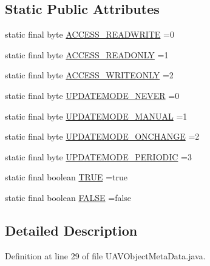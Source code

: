 \subsection*{Static Public Attributes}
\begin{DoxyCompactItemize}
\item 
static final byte \hyperlink{classorg_1_1taulabs_1_1uavtalk_1_1_u_a_v_object_meta_data_a44a12338675af0ecb539a87a976cac48}{A\-C\-C\-E\-S\-S\-\_\-\-R\-E\-A\-D\-W\-R\-I\-T\-E} =0
\item 
static final byte \hyperlink{classorg_1_1taulabs_1_1uavtalk_1_1_u_a_v_object_meta_data_a3c2ab96994694c0e1fd3578b84644d18}{A\-C\-C\-E\-S\-S\-\_\-\-R\-E\-A\-D\-O\-N\-L\-Y} =1
\item 
static final byte \hyperlink{classorg_1_1taulabs_1_1uavtalk_1_1_u_a_v_object_meta_data_a5f5fd42d243c55d5b5d1c657389cb56d}{A\-C\-C\-E\-S\-S\-\_\-\-W\-R\-I\-T\-E\-O\-N\-L\-Y} =2
\item 
static final byte \hyperlink{classorg_1_1taulabs_1_1uavtalk_1_1_u_a_v_object_meta_data_a361f627b8e98cf0b4521954857e8b001}{U\-P\-D\-A\-T\-E\-M\-O\-D\-E\-\_\-\-N\-E\-V\-E\-R} =0
\item 
static final byte \hyperlink{classorg_1_1taulabs_1_1uavtalk_1_1_u_a_v_object_meta_data_aab602b38cbe3e4aebba939b0c865e45a}{U\-P\-D\-A\-T\-E\-M\-O\-D\-E\-\_\-\-M\-A\-N\-U\-A\-L} =1
\item 
static final byte \hyperlink{classorg_1_1taulabs_1_1uavtalk_1_1_u_a_v_object_meta_data_aa5ba43265fa65d0959aff2a0107944d3}{U\-P\-D\-A\-T\-E\-M\-O\-D\-E\-\_\-\-O\-N\-C\-H\-A\-N\-G\-E} =2
\item 
static final byte \hyperlink{classorg_1_1taulabs_1_1uavtalk_1_1_u_a_v_object_meta_data_a0de23ed97539abcf565c1fdc46d47f80}{U\-P\-D\-A\-T\-E\-M\-O\-D\-E\-\_\-\-P\-E\-R\-I\-O\-D\-I\-C} =3
\item 
static final boolean \hyperlink{classorg_1_1taulabs_1_1uavtalk_1_1_u_a_v_object_meta_data_afe6b13b38b4a68be0c61b04097472089}{T\-R\-U\-E} =true
\item 
static final boolean \hyperlink{classorg_1_1taulabs_1_1uavtalk_1_1_u_a_v_object_meta_data_a7a131f4c7a6d2b65f8dd71aa62631ecf}{F\-A\-L\-S\-E} =false
\end{DoxyCompactItemize}


\subsection{Detailed Description}


Definition at line 29 of file U\-A\-V\-Object\-Meta\-Data.\-java.



